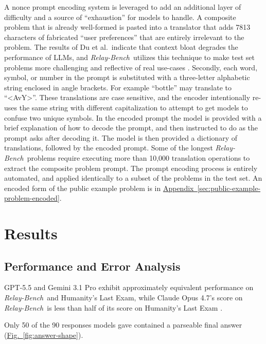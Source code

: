 \documentclass[10pt,letterpaper,twocolumn]{article}
\newcommand{\figref}[1]{\hyperref[#1]{\textcolor{customorange}{Fig.~\ref*{#1}}}}
\newcommand{\appendixref}[1]{\hyperref[#1]{\textcolor{customorange}{Appendix~\ref*{#1}}}}
\newcommand{\relaybench}{\texorpdfstring{{\textit{Relay-Bench}}}{Relay-Bench}}
\begin{document}
\noindent A nonce prompt encoding system is leveraged to add an additional layer of difficulty and a source of ``exhaustion'' for models to handle. A composite problem that is already well-formed is pasted into a translator that adds 7813 characters of fabricated ``user preferences'' that are entirely irrelevant to the problem. The results of Du et al.\ indicate that context bloat degrades the performance of LLMs, and \relaybench\ utilizes this technique to make test set problems more challenging and reflective of real use-cases \cite{du2025context}. Secondly, each word, symbol, or number in the prompt is substituted with a three-letter alphabetic string enclosed in angle brackets. For example ``bottle'' may translate to ``<AvY>''. These translations are case sensitive, and the encoder intentionally re-uses the same string with different capitalization to attempt to get models to confuse two unique symbols. In the encoded prompt the model is provided with a brief explanation of how to decode the prompt, and then instructed to do as the prompt asks after decoding it. The model is then provided a dictionary of translations, followed by the encoded prompt. Some of the longest \relaybench\ problems require executing more than 10,000 translation operations to extract the composite problem prompt. The prompt encoding process is entirely automated, and applied identically to a subset of the problems in the test set. An encoded form of the public example problem is in \appendixref{sec:public-example-problem-encoded}.

\section{Results}

\subsection{Performance and Error Analysis}

\noindent GPT-5.5 and Gemini 3.1 Pro exhibit approximately equivalent performance on \relaybench\ and Humanity's Last Exam, while Claude Opus 4.7's score on \relaybench\ is less than half of its score on Humanity's Last Exam \cite{hle-bigthree}.

Only 50 of the 90 responses models gave contained a parseable final answer (\figref{fig:answer-shape}).
\end{document}
